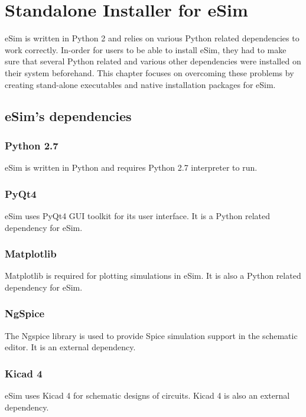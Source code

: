 \documentclass[12pt,a4paper]{report}
\begin{document}
\chapter{\textbf{Standalone Installer for eSim}}
eSim is written in Python 2 and relies on various Python related dependencies to work correctly. In-order for users to be able to install eSim, they had to make sure that several Python related and various other dependencies were installed on their system beforehand. This chapter focuses on overcoming these problems by creating stand-alone executables and native installation packages for eSim.
\section{eSim's dependencies}
\subsection{Python 2.7}
eSim is written in Python and requires Python 2.7 interpreter to run.
\subsection{PyQt4}
eSim uses PyQt4 GUI toolkit for its user interface. It is a Python related dependency for eSim.
\subsection{Matplotlib}
Matplotlib is required for plotting simulations in eSim.  It is also a Python related dependency for eSim.
\subsection{NgSpice}
The Ngspice library is used to provide Spice simulation support in the schematic editor. It is an external dependency.
\subsection{Kicad 4}
eSim uses Kicad 4 for schematic designs of circuits. Kicad 4 is also an external dependency.
\end{document}
